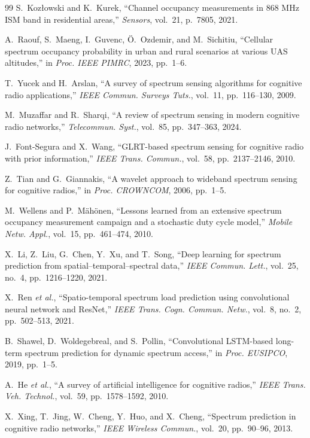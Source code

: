 \documentclass[lettersize,journal]{IEEEtran}
\begin{document}
\begin{thebibliography}{99}
 S.~Koz{\l}owski and K.~Kurek, ``Channel occupancy measurements in 868 MHz ISM band in residential areas,'' \emph{Sensors}, vol.~21, p.~7805, 2021.

 A.~Raouf, S.~Maeng, I.~Guvenc, \"O.~Ozdemir, and M.~Sichitiu, ``Cellular spectrum occupancy probability in urban and rural scenarios at various UAS altitudes,'' in \emph{Proc. IEEE PIMRC}, 2023, pp.~1--6.

 T.~Yucek and H.~Arslan, ``A survey of spectrum sensing algorithms for cognitive radio applications,'' \emph{IEEE Commun. Surveys Tuts.}, vol.~11, pp.~116--130, 2009.

 M.~Muzaffar and R.~Sharqi, ``A review of spectrum sensing in modern cognitive radio networks,'' \emph{Telecommun. Syst.}, vol.~85, pp.~347--363, 2024.

 J.~Font-Segura and X.~Wang, ``GLRT-based spectrum sensing for cognitive radio with prior information,'' \emph{IEEE Trans. Commun.}, vol.~58, pp.~2137--2146, 2010.

 Z.~Tian and G.~Giannakis, ``A wavelet approach to wideband spectrum sensing for cognitive radios,'' in \emph{Proc. CROWNCOM}, 2006, pp.~1--5.

 M.~Wellens and P.~M\"ah\"onen, ``Lessons learned from an extensive spectrum occupancy measurement campaign and a stochastic duty cycle model,'' \emph{Mobile Netw. Appl.}, vol.~15, pp.~461--474, 2010.

 X.~Li, Z.~Liu, G.~Chen, Y.~Xu, and T.~Song, ``Deep learning for spectrum prediction from spatial--temporal--spectral data,'' \emph{IEEE Commun. Lett.}, vol.~25, no.~4, pp.~1216--1220, 2021.

 X.~Ren \emph{et al.}, ``Spatio-temporal spectrum load prediction using convolutional neural network and ResNet,'' \emph{IEEE Trans. Cogn. Commun. Netw.}, vol.~8, no.~2, pp.~502--513, 2021.

 B.~Shawel, D.~Woldegebreal, and S.~Pollin, ``Convolutional LSTM-based long-term spectrum prediction for dynamic spectrum access,'' in \emph{Proc. EUSIPCO}, 2019, pp.~1--5.

 A.~He \emph{et al.}, ``A survey of artificial intelligence for cognitive radios,'' \emph{IEEE Trans. Veh. Technol.}, vol.~59, pp.~1578--1592, 2010.

 X.~Xing, T.~Jing, W.~Cheng, Y.~Huo, and X.~Cheng, ``Spectrum prediction in cognitive radio networks,'' \emph{IEEE Wireless Commun.}, vol.~20, pp.~90--96, 2013.


\end{thebibliography}
\end{document}
